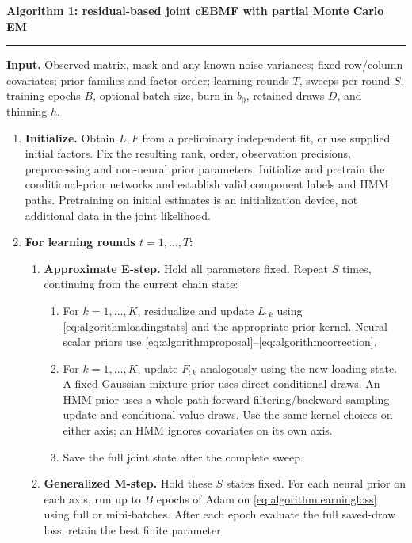\clearpage
\noindent\textbf{Algorithm 1: residual-based joint cEBMF with partial Monte Carlo EM}
\par\smallskip\hrule\smallskip
\textbf{Input.} Observed matrix, mask and any known noise variances; fixed
row/column covariates; prior
families and factor order; learning rounds \(T\), sweeps per round \(S\),
training epochs \(B\), optional batch size, burn-in \(b_0\), retained draws
\(D\), and thinning \(h\).
\begin{enumerate}[leftmargin=*,label=\textbf{\arabic*.},itemsep=5pt]
\item \textbf{Initialize.} Obtain \(L,F\) from a preliminary independent
fit, or use supplied initial factors. Fix the resulting rank, order,
observation precisions, preprocessing and non-neural prior parameters.
Initialize and pretrain the conditional-prior networks and establish valid
component labels and HMM paths. Pretraining on initial estimates is an
initialization device, not additional data in the joint likelihood.
\item \textbf{For learning rounds \(t=1,\ldots,T\):}
  \begin{enumerate}[label=(\alph*),leftmargin=*,itemsep=3pt]
  \item \textbf{Approximate E-step.} Hold all parameters fixed. Repeat \(S\)
  times, continuing from the current chain state:
    \begin{enumerate}[label=(\roman*),leftmargin=*,itemsep=2pt]
    \item For \(k=1,\ldots,K\), residualize and update \(L_{:k}\) using
    \eqref{eq:algorithmloadingstats} and the appropriate prior kernel.
    Neural scalar priors use \eqref{eq:algorithmproposal}--\eqref{eq:algorithmcorrection}.
    \item For \(k=1,\ldots,K\), update \(F_{:k}\) analogously using the
    new loading state. A fixed Gaussian-mixture prior uses direct conditional
    draws. An HMM prior uses a whole-path forward-filtering/backward-sampling
    update and conditional value draws. Use the same kernel choices on
    either axis; an HMM ignores covariates on its own axis.
    \item Save the full joint state after the complete sweep.
    \end{enumerate}
  \item \textbf{Generalized M-step.} Hold these \(S\) states fixed.
  For each neural prior on each axis, run up to \(B\) epochs of Adam on
  \eqref{eq:algorithmlearningloss} using full or mini-batches. After each
  epoch evaluate the full saved-draw loss; retain the best finite parameter

\end{enumerate}
\end{enumerate}
